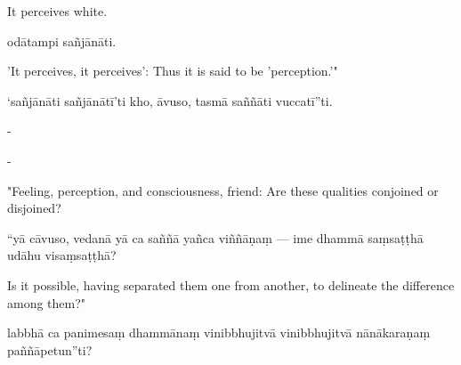 \begin{samepage}
\begin{leftcolumn*}
It perceives white.
\end{leftcolumn*}

\begin{rightcolumn}
odātampi sañjānāti.
\end{rightcolumn}
\end{samepage}

\begin{samepage}
\begin{leftcolumn*}
'It perceives, it perceives': Thus it is said to be 'perception.'"
\end{leftcolumn*}

\begin{rightcolumn}
‘sañjānāti sañjānātī’ti kho, āvuso, tasmā saññāti vuccatī”ti.
\end{rightcolumn}
\end{samepage}

\begin{samepage}
\begin{leftcolumn*}
-
\end{leftcolumn*}

\begin{rightcolumn}
-
\end{rightcolumn}
\end{samepage}

\begin{samepage}
\begin{leftcolumn*}
"Feeling, perception, and consciousness, friend: Are these qualities conjoined or disjoined?
\end{leftcolumn*}

\begin{rightcolumn}
“yā cāvuso, vedanā yā ca saññā yañca viññāṇaṃ — ime dhammā saṃsaṭṭhā udāhu visaṃsaṭṭhā?
\end{rightcolumn}
\end{samepage}

\begin{samepage}
\begin{leftcolumn*}
Is it possible, having separated them one from another, to delineate the difference among them?"
\end{leftcolumn*}

\begin{rightcolumn}
labbhā ca panimesaṃ dhammānaṃ vinibbhujitvā vinibbhujitvā nānākaraṇaṃ paññāpetun”ti?
\end{rightcolumn}
\end{samepage}

